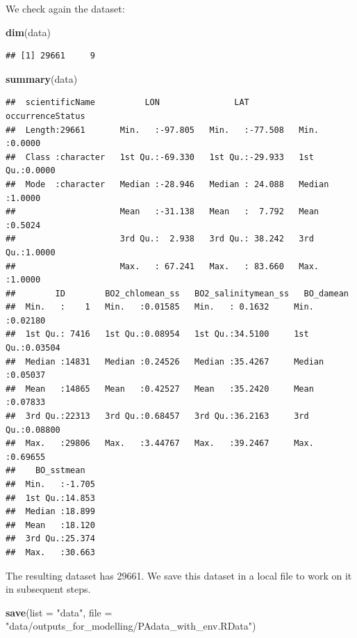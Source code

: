 \documentclass[
]{book}
\newenvironment{Shaded}{\begin{snugshade}}{\end{snugshade}}
\newcommand{\AttributeTok}[1]{\textcolor[rgb]{0.13,0.29,0.53}{#1}}
\newcommand{\FunctionTok}[1]{\textcolor[rgb]{0.13,0.29,0.53}{\textbf{#1}}}
\newcommand{\NormalTok}[1]{#1}
\newcommand{\StringTok}[1]{\textcolor[rgb]{0.31,0.60,0.02}{#1}}
\begin{document}
We check again the dataset:

\begin{Shaded}
\begin{Highlighting}[]
\FunctionTok{dim}\NormalTok{(data)}
\end{Highlighting}
\end{Shaded}

\begin{verbatim}
## [1] 29661     9
\end{verbatim}

\begin{Shaded}
\begin{Highlighting}[]
\FunctionTok{summary}\NormalTok{(data)}
\end{Highlighting}
\end{Shaded}

\begin{verbatim}
##  scientificName          LON               LAT          occurrenceStatus
##  Length:29661       Min.   :-97.805   Min.   :-77.508   Min.   :0.0000  
##  Class :character   1st Qu.:-69.330   1st Qu.:-29.933   1st Qu.:0.0000  
##  Mode  :character   Median :-28.946   Median : 24.088   Median :1.0000  
##                     Mean   :-31.138   Mean   :  7.792   Mean   :0.5024  
##                     3rd Qu.:  2.938   3rd Qu.: 38.242   3rd Qu.:1.0000  
##                     Max.   : 67.241   Max.   : 83.660   Max.   :1.0000  
##        ID        BO2_chlomean_ss   BO2_salinitymean_ss   BO_damean      
##  Min.   :    1   Min.   :0.01585   Min.   : 0.1632     Min.   :0.02180  
##  1st Qu.: 7416   1st Qu.:0.08954   1st Qu.:34.5100     1st Qu.:0.03504  
##  Median :14831   Median :0.24526   Median :35.4267     Median :0.05037  
##  Mean   :14865   Mean   :0.42527   Mean   :35.2420     Mean   :0.07833  
##  3rd Qu.:22313   3rd Qu.:0.68457   3rd Qu.:36.2163     3rd Qu.:0.08800  
##  Max.   :29806   Max.   :3.44767   Max.   :39.2467     Max.   :0.69655  
##    BO_sstmean    
##  Min.   :-1.705  
##  1st Qu.:14.853  
##  Median :18.899  
##  Mean   :18.120  
##  3rd Qu.:25.374  
##  Max.   :30.663
\end{verbatim}

The resulting dataset has 29661. We save this dataset in a local file to work on it in subsequent steps.

\begin{Shaded}
\begin{Highlighting}[]
\FunctionTok{save}\NormalTok{(}\AttributeTok{list =} \StringTok{"data"}\NormalTok{, }\AttributeTok{file =} \StringTok{"data/outputs\_for\_modelling/PAdata\_with\_env.RData"}\NormalTok{)}
\end{Highlighting}
\end{Shaded}
\end{document}

